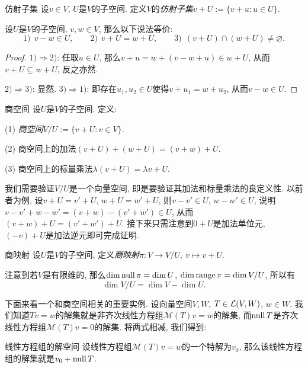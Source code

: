 \begin{definition}{仿射子集}
	设$v \in V$, $U$是$V$的子空间. 定义$V$的\textit{仿射子集}$v+U := \{ v+u:u \in U \}$. 
\end{definition}

\begin{proposition}{}
	设$U$是$V$的子空间, $v,w \in V$, 那么以下说法等价: 
	$$1)~~ v-w \in U,\qquad 2)~~ v+U=w+U,\qquad 3)~~ (v+U) \cap (w+U) \neq \varnothing.$$
\end{proposition}
\begin{proof}
	$1) \Rightarrow 2)$: 任取$u \in U$, 那么$v+u = w+(v-w+u) \in w+U$, 从而$v+U \subseteq w+U$, 反之亦然. 
	
	$2) \Rightarrow 3)$: 显然. $3) \Rightarrow 1)$: 即存在$u_1,u_2 \in U$使得$v+u_1=w+u_2$, 从而$v-w \in U$. 
\end{proof}

\begin{definition}{商空间}
	设$U$是$V$的子空间. 定义: 
	
	(1) \textit{商空间}$V/U:=\{ v+U:v \in V \}$. 
	
	(2) 商空间上的加法$(v+U)+(w+U) = (v+w)+U$.
	
	(3) 商空间上的标量乘法$\lambda (v+U) = \lambda v+U$. 
\end{definition}

我们需要验证$V/U$是一个向量空间, 即是要验证其加法和标量乘法的良定义性. 以前者为例, 设$v+U=v'+U$, $w+U=w'+U$, 则$v-v' \in U$, $w-w' \in U$, 说明$v-v'+w-w' = (v+w) - (v'+w') \in U$, 从而$(v+w) + U = (v'+w') + U$. 接下来只需注意到$0+U$是加法单位元, $(-v)+U$是加法逆元即可完成证明. 

\begin{definition}{商映射}
	设$U$是$V$的子空间, 定义\textit{商映射}$\pi : V \to V/U,~v \mapsto v+U$. 
\end{definition}

注意到若$V$是有限维的, 那么$\dim \operatorname{null} \pi = \dim U$, $\dim \operatorname{range} \pi = \dim V/U$, 所以有$$\dim V/U = \dim V - \dim U. $$

下面来看一个和商空间相关的重要实例. 设向量空间$V,W$, $T \in \mathcal{L} (V,W)$, $w \in W$. 我们知道$Tv=w$的解集就是非齐次线性方程组$\mathcal{M}(T) v = w$的解集, 而$\operatorname{null} T$是齐次线性方程组$\mathcal{M}(T) v = 0$的解集. 将两式相减, 我们得到: 

\begin{proposition}{线性方程组的解空间}
	设线性方程组$\mathcal{M}(T)v=w$的一个特解为$v_0$, 那么该线性方程组的解集就是$v_0+\operatorname{null} T$. 
\end{proposition}

